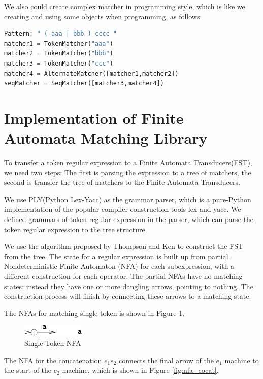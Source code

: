We also could create complex matcher in programming style, which is like we creating and using some objects when programming, as follows:

\begin{framed}
\small
\begin{lstlisting}[language=Python]
Pattern: " ( aaa | bbb ) cccc "
matcher1 = TokenMatcher("aaa")
matcher2 = TokenMatcher("bbb")
matcher3 = TokenMatcher("ccc")
matcher4 = AlternateMatcher([matcher1,matcher2])
seqMatcher = SeqMatcher([matcher3,matcher4])
\end{lstlisting}
\end{framed}

\section{Implementation of Finite Automata Matching Library }

To transfer a token regular expression to a Finite Automata Transducers(FST), we need two steps: The first is parsing the expression to a tree of matchers, the second is transfer the tree of matchers to the Finite Automata Transducers.

We use PLY(Python Lex-Yacc) as the grammar parser, which  is a pure-Python implementation of the popular compiler construction tools lex and yacc. We defined  grammars of token regular expression in the parser, which can parse the token regular expression to the tree structure.

We use the algorithm proposed by Thompson and Ken\cite{thompson1968programming} to construct the FST from the tree. The state for a regular expression is built up from partial Nondeterministic Finite Automaton (NFA)  for each subexpression, with a different construction for each operator. The partial NFAs have no matching states: instead they have one or more dangling arrows, pointing to nothing. The construction process will finish by connecting these arrows to a matching state.

The NFAs for matching single token is shown in Figure \ref{fig:nfa_single}.

\begin{figure}[htbp]
  \centering
  \includegraphics[scale=1]{images/single_token.png}
  \caption{Single Token NFA}
  \label{fig:nfa_single}
\end{figure}

The NFA for the concatenation $e_1e_2$ connects the final arrow of the $e_1$ machine to the start of the $e_2$ machine, which is shown in Figure \ref{fig:nfa_cocat}.

